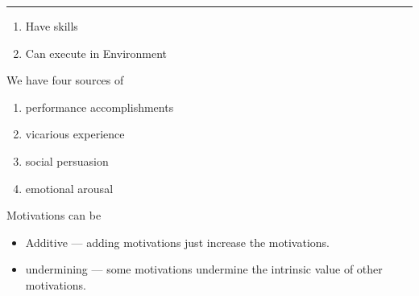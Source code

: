 \documentclass[12pt]{article}
\begin{document}
\hrule

\begin{enumerate}
	\item Have skills
	\item Can execute in Environment
\end{enumerate}

We have four sources of
\begin{enumerate}
	\item performance accomplishments
	\item vicarious experience
	\item social persuasion
	\item emotional arousal
\end{enumerate}

Motivations can be
\begin{itemize}
	\item Additive --- adding motivations just increase the motivations.
	\item undermining --- some motivations undermine the intrinsic value of
		other motivations.
\end{itemize}
\end{document}
